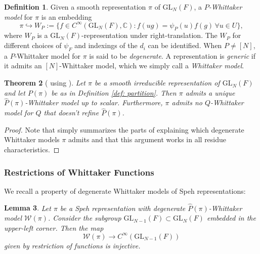 \documentclass{amsart}
\newcommand{\into}{\hookrightarrow}
\newcommand{\mc}[1]{\mathcal{#1}}
\newcommand{\GL}{\mathrm{GL}}
\newcommand{\1}{\m 1}
\newcommand{\BC}{\mathbb C}
\newtheorem{thm}{Theorem}[subsection]
\newtheorem{lem}[thm]{Lemma}
\theoremstyle{remark}
\theoremstyle{definition}
\newtheorem{dfn}[thm]{Definition}
\numberwithin{equation}{subsection}
\begin{document}
\begin{dfn}
Given a smooth representation $\pi$ of $\GL_N(F)$, a \emph{$P$-Whittaker model} for $\pi$ is an embedding 
\begin{equation} \label{eq: def whittaker model}
\pi \into W_P := \{f \in C^\infty(\GL_N(F),\BC) : f(ug) = \psi_P(u) f(g) \, \forall u \in U\},
\end{equation}
where $W_P$ is a $\GL_N(F)$-representation under right-translation. The $W_P$ for different choices of $\psi_F$ and indexings of the $d_i$ can be identified. When $P \neq [N]$, a $P$-Whittaker model for $\pi$ is said to be \emph{degenerate}. A representation is \emph{generic} if it admits an $[N]$-Whittaker model, which we simply call a \emph{Whittaker model}. 
\end{dfn}


\begin{thm}[{\cite[\S II.2]{MW87} using \cite{Zel80}}]\label{thm:degenwhittaker}
Let $\pi$ be a smooth irreducible representation of $\GL_N(F)$ and let $P(\pi)$ be as in Definition \ref{def: partition}. Then $\pi$ admits a unique~$\hat P(\pi)$-Whittaker model up to scalar. Furthermore, $\pi$ admits no $Q$-Whittaker model for $Q$ that doesn't refine $\hat P(\pi)$. 
\end{thm}

\begin{proof}
Note that \cite[\S II.2]{MW87} simply summarizes the parts of \cite{Zel80} explaining which degenerate Whittaker models $\pi$ admits and that this argument works in all residue characteristics. 
\end{proof}


\subsubsection{Restrictions of Whittaker Functions}
We recall a property of degenerate Whittaker models of Speh representations:

\begin{lem}\label{lem:restriction}
Let $\pi$ be a Speh representation with degenerate $\hat P(\pi)$-Whittaker model $\mc W(\pi)$. Consider the subgroup $\GL_{N-1}(F) \subset \GL_N(F)$ embedded in the upper-left corner. Then the map 
\[ 
\mc W(\pi) \to C^\infty(\GL_{N-1}(F)) 
\] 
given by restriction of functions is injective.
\end{lem}
\end{document}
